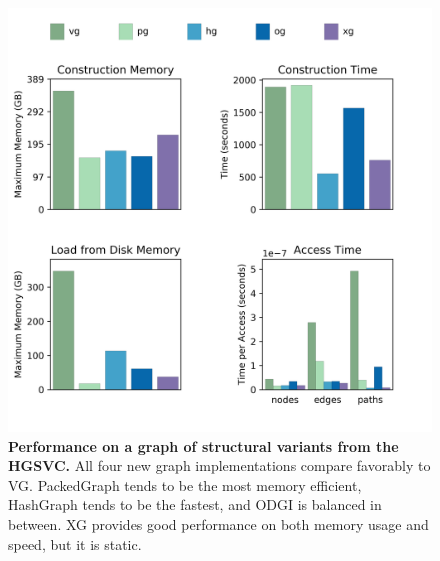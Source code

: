 \documentclass{article}
\begin{document}





\begin{figure}
	\begin{center}
		\includegraphics[width=.75\textwidth]{figures/HGSVC_sorted_gfa.png}
	\end{center}
	\caption{{\label{fig:hgsvc} \textbf{Performance on a graph of structural variants from the HGSVC.} All four new graph implementations compare favorably to VG. PackedGraph tends to be the most memory efficient, HashGraph tends to be the fastest, and ODGI is balanced in between. XG provides good performance on both memory usage and speed, but it is static.}}
\end{figure}
\end{document}
